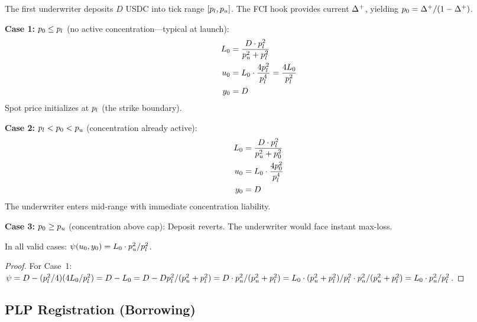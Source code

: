 \begin{definition}\label{def:init-oracle}
The first underwriter deposits $D$ USDC into tick range $[p_l, p_u]$.
The FCI hook provides current $\Delta^{+}$, yielding $p_0 = \Delta^{+}/(1-\Delta^{+})$.

\textbf{Case 1:} $p_0 \leq p_l$ (no active concentration---typical at launch):
\begin{align}
  L_0 &= \frac{D \cdot p_l^2}{p_u^2 + p_l^2} \label{eq:init-L-cold} \\
  u_0 &= L_0 \cdot \frac{4p_l^2}{p_l^4} = \frac{4L_0}{p_l^2} \\
  y_0 &= D
\end{align}
Spot price initializes at $p_l$ (the strike boundary).

\textbf{Case 2:} $p_l < p_0 < p_u$ (concentration already active):
\begin{align}
  L_0 &= \frac{D \cdot p_l^2}{p_u^2 + p_0^2} \label{eq:init-L-warm} \\
  u_0 &= L_0 \cdot \frac{4p_0^2}{p_l^4} \\
  y_0 &= D
\end{align}
The underwriter enters mid-range with immediate concentration liability.

\textbf{Case 3:} $p_0 \geq p_u$ (concentration above cap):
Deposit reverts. The underwriter would face instant max-loss.
\end{definition}

\begin{proposition}\label{prop:init-invariant}
In all valid cases: $\psi(u_0, y_0) = L_0 \cdot p_u^2/p_l^2$.
\end{proposition}

\begin{proof}
For Case~1: $\psi = D - (p_l^2/4)(4L_0/p_l^2) = D - L_0
= D - Dp_l^2/(p_u^2 + p_l^2) = D \cdot p_u^2/(p_u^2 + p_l^2)
= L_0 \cdot (p_u^2 + p_l^2)/p_l^2 \cdot p_u^2/(p_u^2 + p_l^2)
= L_0 \cdot p_u^2/p_l^2$. \qedhere
\end{proof}

\subsection{PLP Registration (Borrowing)}

